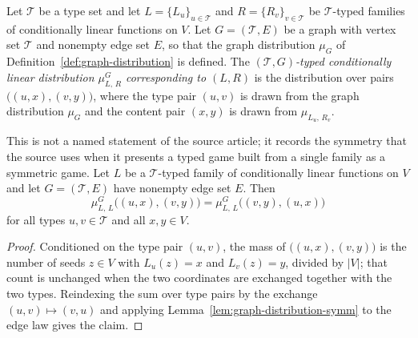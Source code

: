 \begin{definition}\label{def:typed-cl-distributions}
	\leanok
	Let $\mathcal T$ be a type set and let $L = \{L_u\}_{u \in \mathcal T}$ and $R = \{R_v\}_{v \in \mathcal T}$ be $\mathcal T$-typed families of conditionally linear functions on $V$. Let $G = (\mathcal T, E)$ be a graph with vertex set $\mathcal T$ and nonempty edge set $E$, so that the graph distribution $\mu_G$ of Definition~\ref{def:graph-distribution} is defined. The \emph{$(\mathcal T, G)$-typed conditionally linear distribution $\mu^G_{L,\,R}$ corresponding to $(L, R)$} is the distribution over pairs $\bigl( (u, x), (v, y) \bigr)$, where the type pair $(u,v)$ is drawn from the graph distribution $\mu_G$ and the content pair $(x,y)$ is drawn from $\mu_{L_u,\,R_v}$.
\end{definition}

\begin{lemma}\label{lem:typed-cl-distribution-symm}
	\leanok
	This is not a named statement of the source article; it records the symmetry that the source uses when it presents a typed game built from a single family as a symmetric game. Let $L$ be a $\mathcal T$-typed family of conditionally linear functions on $V$ and let $G = (\mathcal T, E)$ have nonempty edge set $E$. Then
	\[
		\mu^G_{L,\,L}\bigl((u, x), (v, y)\bigr) = \mu^G_{L,\,L}\bigl((v, y), (u, x)\bigr)
	\]
	for all types $u, v \in \mathcal T$ and all $x, y \in V$.
\end{lemma}
\begin{proof}
	\leanok
	Conditioned on the type pair $(u,v)$, the mass of $\bigl((u,x),(v,y)\bigr)$ is the number of seeds $z \in V$ with $L_u(z) = x$ and $L_v(z) = y$, divided by $|V|$; that count is unchanged when the two coordinates are exchanged together with the two types. Reindexing the sum over type pairs by the exchange $(u,v) \mapsto (v,u)$ and applying Lemma~\ref{lem:graph-distribution-symm} to the edge law gives the claim.
\end{proof}
